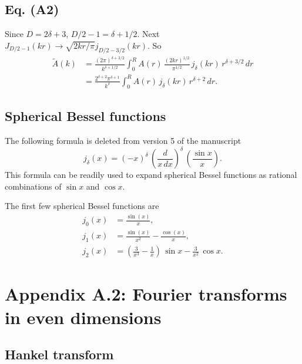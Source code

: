 \documentclass[preprint]{revtex4-1}
\numberwithin{equation}{subsection}
\numberwithin{table}{section}
\begin{document}
\subsection{Eq. (A2)}

Since $D = 2\delta + 3$, $D/2 - 1 = \delta + 1/2$.
%
Next $J_{D/2-1}(kr) \rightarrow \sqrt{2 k r/\pi} j_{D/2-3/2} (kr)$.
%
So
\begin{align*}
\tilde A(k)
&=
\frac{ (2 \pi)^{\delta + 3/2} } { k^{\delta + 1/2} }
\int_0^R
  A(r) \, \frac{ (2kr)^{1/2} } { \pi^{1/2} } \,
  j_\delta(k r) \, r^{\delta + 3/2}\, dr \\
&=
  \frac{ 2^{\delta + 2} \pi^{\delta + 1} } { k^\delta }
\int_0^R
  A(r) \, j_\delta(k r) \, r^{\delta + 2} \, dr.
\end{align*}



\subsection{Spherical Bessel functions}

The following formula is deleted from version 5 of the manuscript
\begin{equation}
  j_\delta(x)
=
  (-x)^\delta \,
  \left(
    \frac{ d }
    { x \, dx }
  \right)^\delta
  \,
  \left(
    \frac{ \sin x } { x }
  \right).
\end{equation}
This formula can be readily used to expand
spherical Bessel functions
as rational combinations of $\sin x$ and $\cos x$.

The first few spherical Bessel functions are
\begin{align*}
  j_0(x)
&=
  \frac{ \sin(x) } { x },
\\
  j_1(x)
&=
  \frac{ \sin(x) } { x^2 }
-
  \frac{ \cos(x) } { x },
\\
  j_2(x)
&=
  \left(
    \frac{ 3 } { x^3 }
    -
    \frac{ 1 } { x }
  \right)
  \,
  \sin x
  -
  \frac{ 3 } { x^2 }
  \,
  \cos x.
\end{align*}



\section{Appendix A.2: Fourier transforms in even dimensions}

\subsection{Hankel transform}
\end{document}
